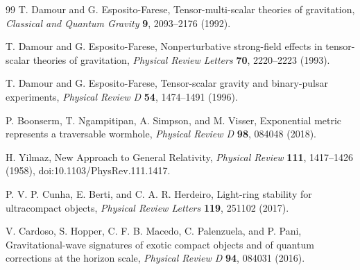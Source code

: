 \documentclass[12pt,a4paper]{article}
\begin{document}
\begin{thebibliography}{99}
T. Damour and G. Esposito-Farese, Tensor-multi-scalar theories of gravitation, \textit{Classical and Quantum Gravity} \textbf{9}, 2093--2176 (1992).

T. Damour and G. Esposito-Farese, Nonperturbative strong-field effects in tensor-scalar theories of gravitation, \textit{Physical Review Letters} \textbf{70}, 2220--2223 (1993).

T. Damour and G. Esposito-Farese, Tensor-scalar gravity and binary-pulsar experiments, \textit{Physical Review D} \textbf{54}, 1474--1491 (1996).

P. Boonserm, T. Ngampitipan, A. Simpson, and M. Visser, Exponential metric represents a traversable wormhole, \textit{Physical Review D} \textbf{98}, 084048 (2018).

H. Yilmaz, New Approach to General Relativity, \textit{Physical Review} \textbf{111}, 1417--1426 (1958), doi:10.1103/PhysRev.111.1417.

P. V. P. Cunha, E. Berti, and C. A. R. Herdeiro, Light-ring stability for ultracompact objects, \textit{Physical Review Letters} \textbf{119}, 251102 (2017).

V. Cardoso, S. Hopper, C. F. B. Macedo, C. Palenzuela, and P. Pani, Gravitational-wave signatures of exotic compact objects and of quantum corrections at the horizon scale, \textit{Physical Review D} \textbf{94}, 084031 (2016).

\end{thebibliography}
\end{document}
